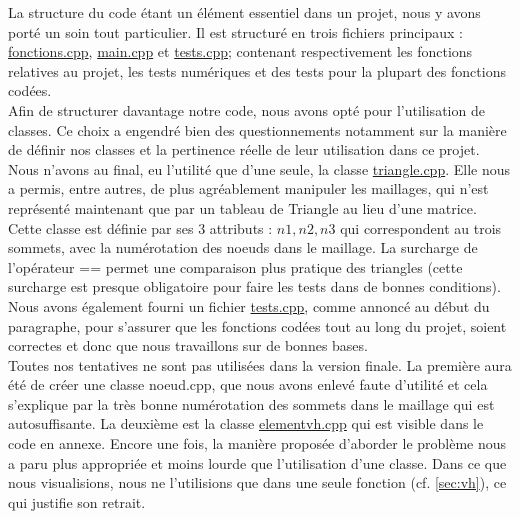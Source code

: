 La structure du code étant un élément essentiel dans un projet, nous y avons porté un soin tout particulier. Il est structuré en trois fichiers principaux : \hyperref[sec:fonctions]{fonctions.cpp}, \hyperref[sec:main]{main.cpp} et \hyperref[sec:tests]{tests.cpp}; contenant respectivement les fonctions relatives au projet, les tests numériques et des tests pour la plupart des fonctions codées. \\

Afin de structurer davantage notre code, nous avons opté pour l'utilisation de classes. Ce choix a engendré bien des questionnements notamment sur la manière de définir nos classes et la pertinence réelle de leur utilisation dans ce projet. Nous n'avons au final, eu l'utilité que d'une seule, la classe \hyperref[sec:triangle]{triangle.cpp}. Elle nous a permis, entre autres, de plus agréablement manipuler les maillages, qui n'est représenté maintenant que par un tableau de Triangle au lieu d'une matrice. Cette classe est définie par ses 3 attributs : $n1, n2, n3$ qui correspondent au trois sommets, avec la numérotation des noeuds dans le maillage. La surcharge de l'opérateur == permet une comparaison plus pratique des triangles (cette surcharge est presque obligatoire pour faire les tests dans de bonnes conditions). \\ 

Nous avons également fourni un fichier \hyperref[secsec:tests]{tests.cpp}, comme annoncé au début du paragraphe, pour s'assurer que les fonctions codées tout au long du projet, soient correctes et donc que nous travaillons sur de bonnes bases. \\

Toutes nos tentatives ne sont pas utilisées dans la version finale. La première aura été de créer une classe noeud.cpp, que nous avons enlevé faute d'utilité et cela s'explique par la très bonne numérotation des sommets dans le maillage qui est autosuffisante. La deuxième est la classe \hyperref[sec:vh]{elementvh.cpp} qui est visible dans le code en annexe. Encore une fois, la manière proposée d'aborder le problème nous a paru plus appropriée et moins lourde que l'utilisation d'une classe. Dans ce que nous visualisions, nous ne l'utilisions que dans une seule fonction (cf. \ref{sec:vh}), ce qui justifie son retrait.